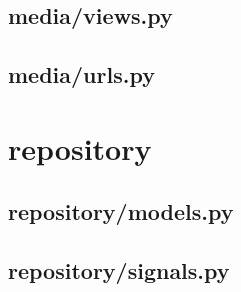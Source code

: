 \subsection{media/views.py}


\subsection{media/urls.py}


%

%


\section{repository}



%

\subsection{repository/models.py}


\subsection{repository/signals.py}


